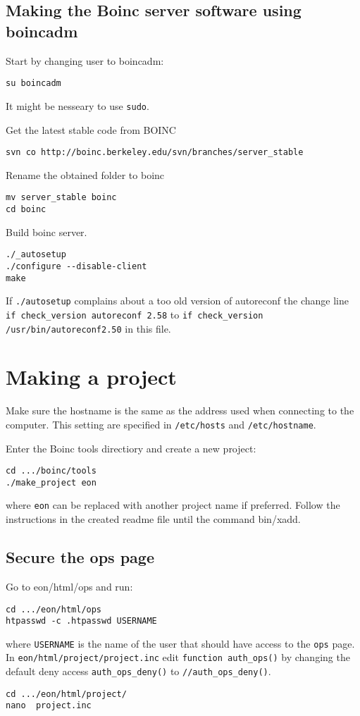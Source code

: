\documentclass{article}
\begin{document}
\subsection{Making the Boinc server software using boincadm}
Start by changing user to boincadm:
\begin{verbatim}
su boincadm
\end{verbatim}
It might be nesseary to use \texttt{sudo}.

Get the latest stable code from BOINC
\begin{verbatim}
svn co http://boinc.berkeley.edu/svn/branches/server_stable
\end{verbatim}
%
Rename the obtained folder to boinc
\begin{verbatim}
mv server_stable boinc
cd boinc
\end{verbatim}
%
Build boinc server.
\begin{verbatim}
./_autosetup
./configure --disable-client
make
\end{verbatim}
%
If \texttt{./autosetup} complains about a too old version of autoreconf the change line \texttt{if check\_version autoreconf 2.58} to \texttt{if check\_version /usr/bin/autoreconf2.50} in this file.
%
\section{Making a project}
Make sure the hostname is the same as the address used when connecting to the computer. This setting are specified in \texttt{/etc/hosts} and \texttt{/etc/hostname}.

Enter the Boinc tools directiory and create a new project:
\begin{verbatim}
cd .../boinc/tools
./make_project eon
\end{verbatim}
where \texttt{eon} can be replaced with another project name if preferred.
Follow the instructions in the created readme file until the command bin/xadd.

\subsection{Secure the ops page}
Go to eon/html/ops and run:
\begin{verbatim}
cd .../eon/html/ops
htpasswd -c .htpasswd USERNAME
\end{verbatim}
where \texttt{USERNAME} is the name of the user that should have access to the \texttt{ops} page.
In \texttt{eon/html/project/project.inc} edit \texttt{function auth\_ops()} by changing the default deny access \texttt{auth\_ops\_deny()} to \texttt{//auth\_ops\_deny()}.
\begin{verbatim}
cd .../eon/html/project/
nano  project.inc
\end{verbatim}
\end{document}
